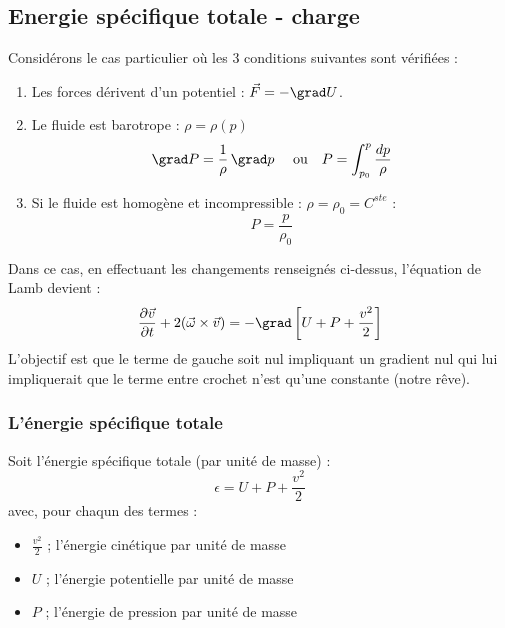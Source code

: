 \subsection{Energie spécifique totale - charge}
Considérons le cas particulier où les 3 conditions suivantes sont vérifiées :
\begin{enumerate}
	\item Les forces dérivent d'un potentiel : $\vec{F} = -\grad U$.
	\item Le fluide est barotrope : $\rho = \rho(p)$
	      \begin{equation}
	      	\grad P  = \frac{1}{\rho}\,\grad p\ \ \ \ \text{ou }\ \ P = \int_{p_0}^p \frac{dp}
	      	{\rho}
	      \end{equation}
	\item Si le fluide est homogène et incompressible : $\rho = \rho_0 = C^{ste}$ :
	      \begin{equation}
	      	P = \frac{p}{\rho_0}
	      \end{equation}
\end{enumerate}	
Dans ce cas, en effectuant les changements renseignés ci-dessus, l'équation de
Lamb devient :
\begin{equation}
	\frac{\partial \vec{v}}{\partial t} + 2(\vec{\omega}\times\vec{v}) = -\grad\left[
	U + P +\frac{v^2}{2}\right]
\end{equation}
L'objectif est que le terme de gauche soit nul impliquant un gradient nul qui lui
impliquerait que le terme entre crochet n'est qu'une constante (notre rêve).
	
\subsubsection{L'énergie spécifique totale}
Soit l'énergie spécifique totale (par unité de masse) :
\begin{equation}
	\epsilon = U + P + \frac{v^2}{2}
\end{equation}
avec, pour chaqun des termes :
\begin{itemize}
	\item $\frac{v^2}{2}$ ; l'énergie cinétique par unité de masse
	\item $U$ ; l'énergie potentielle par unité de masse
	\item $P$ ; l'énergie de pression par unité de masse
\end{itemize}
		
